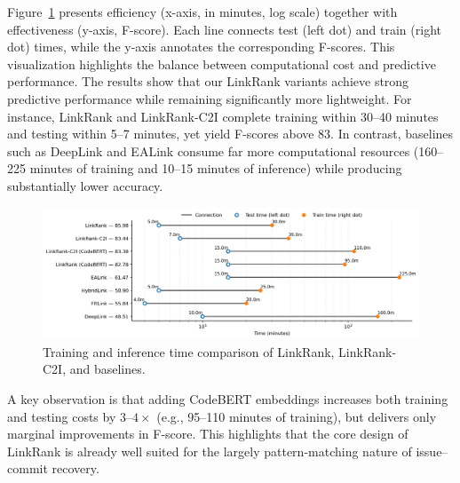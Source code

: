 Figure~\ref{fig:time} presents efficiency (x-axis, in minutes, log scale) together with effectiveness (y-axis, F-score). Each line connects test (left dot) and train (right dot) times, while the y-axis annotates the corresponding F-scores. This visualization highlights the balance between computational cost and predictive performance. The results show that our LinkRank variants achieve strong predictive performance while remaining significantly more lightweight. For instance, LinkRank and LinkRank-C2I complete training within 30--40 minutes and testing within 5--7 minutes, yet yield F-scores above 83. In contrast, baselines such as DeepLink and EALink consume far more computational resources (160--225 minutes of training and 10--15 minutes of inference) while producing substantially lower accuracy.\\

\begin{figure}[htbp]
	\centering
	\includegraphics[width=\linewidth]{Figures/time.png}
	\caption{Training and inference time comparison of LinkRank, LinkRank-C2I, and baselines. }
	\label{fig:time}
\end{figure}

A key observation is that adding CodeBERT embeddings increases both training and testing costs by $3$--$4\times$ (e.g., 95--110 minutes of training), but delivers only marginal improvements in F-score. This highlights that the core design of LinkRank is already well suited for the largely pattern-matching nature of issue--commit recovery.




